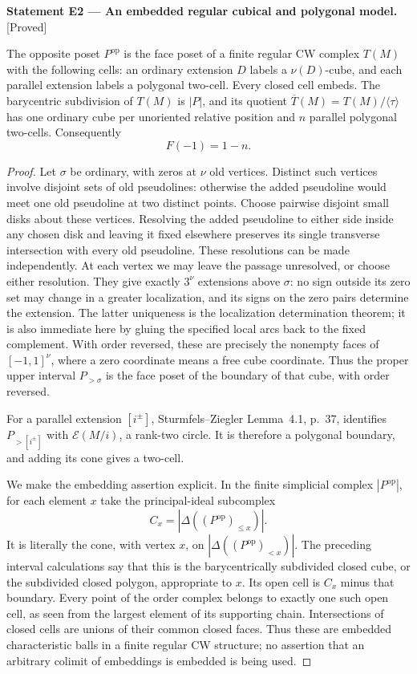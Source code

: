 \documentclass[11pt,a4paper]{article}
\newenvironment{resultenv}[3]{\par\medskip\phantomsection\label{#1}\noindent\textbf{Statement #1 --- #3.}\quad\textsf{[#2]}\par\smallskip\noindent\ignorespaces}{\par\medskip}
\begin{document}
\begin{resultenv}{E2}{Proved}{An embedded regular cubical and polygonal model}
The opposite poset $P^{\mathrm{op}}$ is the face poset of a finite regular CW
complex $T(M)$ with the following cells: an ordinary extension $D$ labels a
$\nu(D)$-cube, and each parallel extension labels a polygonal two-cell.
Every closed cell embeds. The barycentric subdivision of $T(M)$ is $|P|$,
and its quotient $\overline T(M)=T(M)/\langle\tau\rangle$ has one ordinary
cube per unoriented relative position and $n$ parallel polygonal two-cells.
Consequently
\[
 \boxed{F(-1)=1-n.}
\]
\end{resultenv}
\begin{proof}
Let $\sigma$ be ordinary, with zeros at $\nu$ old vertices. Distinct such
vertices involve disjoint sets of old pseudolines: otherwise the added
pseudoline would meet one old pseudoline at two distinct points. Choose
pairwise disjoint small disks about these vertices. Resolving the added
pseudoline to either side inside any chosen disk and leaving it fixed
elsewhere preserves its single transverse intersection with every old
pseudoline. These resolutions can be made independently. At each vertex we
may leave the passage unresolved, or choose either resolution. They give
exactly $3^\nu$ extensions above $\sigma$: no sign outside its zero set may
change in a greater localization, and its signs on the zero pairs determine
the extension. The latter uniqueness is the localization determination
theorem; it is also immediate here by gluing the specified local arcs back
to the fixed complement. With order reversed, these are precisely the
nonempty faces of $[-1,1]^\nu$, where a zero coordinate means a free cube
coordinate. Thus the proper upper interval $P_{>\sigma}$ is the face poset
of the boundary of that cube, with order reversed.

For a parallel extension $[i^\pm]$, Sturmfels--Ziegler Lemma~4.1, p.~37,
identifies $P_{>[i^\pm]}$ with $\mathcal E(M/i)$, a rank-two circle. It is
therefore a polygonal boundary, and adding its cone gives a two-cell.

We make the embedding assertion explicit. In the finite simplicial complex
$|P^{\mathrm{op}}|$, for each element $x$ take the principal-ideal
subcomplex
\[
 C_x=|\Delta((P^{\mathrm{op}})_{\leq x})|.
\]
It is literally the cone, with vertex $x$, on
$|\Delta((P^{\mathrm{op}})_{<x})|$. The preceding interval calculations say
that this is the barycentrically subdivided closed cube, or the subdivided
closed polygon, appropriate to $x$. Its open cell is $C_x$ minus that
boundary. Every point of the order complex belongs to exactly one such
open cell, as seen from the largest element of its supporting chain.
Intersections of closed cells are unions of their common closed faces.
Thus these are embedded characteristic balls in a finite regular CW
structure; no assertion that an arbitrary colimit of embeddings is embedded
is being used.


\end{proof}
\end{document}
